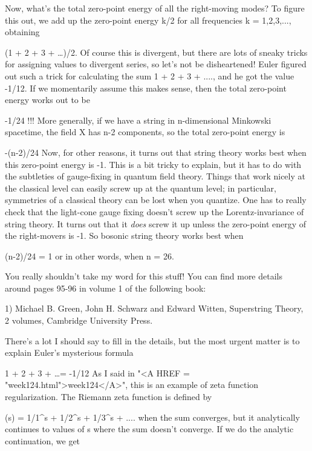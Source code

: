 Now, what's the total zero-point energy of all the right-moving modes?
To figure this out, we add up the zero-point energy k/2 for all
frequencies k = 1,2,3,..., obtaining

                     (1 + 2 + 3 + \ldots  )/2.
Of course this is divergent, but there are lots of sneaky tricks for
assigning values to divergent series, so let's not be disheartened!  
Euler figured out such a trick for calculating the sum 1 + 2 + 3 + ....,
and he got the value -1/12.  If we momentarily assume this makes sense,
then the total zero-point energy works out to be

                            -1/24 !!!
More generally, if we have a string in n-dimensional Minkowski spacetime,
the field X has n-2 components, so the total zero-point energy is

                           -(n-2)/24
Now, for other reasons, it turns out that string theory works best when
this zero-point energy is -1.  This is a bit tricky to explain, but it
has to do with the subtleties of gauge-fixing in quantum field theory.
Things that work nicely at the classical level can easily screw up at
the quantum level; in particular, symmetries of a classical theory can
be lost when you quantize.  One has to really check that the light-cone
gauge fixing doesn't screw up the Lorentz-invariance of string theory. 
It turns out that it \emph{does} screw it up unless the zero-point energy of
the right-movers is -1.  So bosonic string theory works best when

                          (n-2)/24 = 1
or in other words, when n = 26.

You really shouldn't take my word for this stuff!  You can find more 
details around pages 95-96 in volume 1 of the following book:

1) Michael B. Green, John H. Schwarz and Edward Witten, Superstring Theory,
2 volumes, Cambridge University Press.

There's a lot I should say to fill in the details, but the most urgent 
matter is to explain Euler's mysterious formula

                      1 + 2 + 3 + \ldots  = -1/12
As I said in "<A HREF = "week124.html">week124</A>", this is an example of zeta function regularization.  
The Riemann zeta function is defined by

                      \zeta (s) = 1/1^{s} + 1/2^{s} + 1/3^{s} + ....
when the sum converges, but it analytically continues to values of s where 
the sum doesn't converge.  If we do the analytic continuation, we get 


